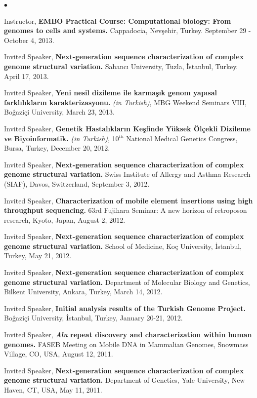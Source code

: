 \documentclass[margin,line]{res}
\newenvironment{list2}{
  \begin{list}{$\bullet$}{%
      \setlength{\itemsep}{0in}
      \setlength{\parsep}{0in} \setlength{\parskip}{0in}
      \setlength{\topsep}{0in} \setlength{\partopsep}{0in} 
      \setlength{\leftmargin}{0.2in}}}{\end{list}}
\begin{document}
\begin{resume}
\begin{list2}
\item 
  Instructor,
  {\bf EMBO Practical Course: Computational biology: From genomes to cells and systems.}
  Cappadocia, Nevşehir, Turkey. September 29 - October 4, 2013.
\item
  Invited Speaker, 
  {\bf  Next-generation sequence characterization of complex genome structural variation.}
  Sabancı University, Tuzla, İstanbul, Turkey. April 17, 2013.
\item
  Invited Speaker, 
  {\bf Yeni nesil dizileme ile karmaşık genom yapısal farklılıkların karakterizasyonu.} {\it (in Turkish)},
  MBG Weekend Seminars VIII, Boğaziçi University, March 23, 2013.  
\item
  Invited Speaker, 
  {\bf Genetik Hastalıkların Keşfinde Yüksek Ölçekli Dizileme ve Biyoinformatik.} {\it (in Turkish)},
  10$^{th}$ National Medical Genetics Congress, Bursa, Turkey,  December 20, 2012.
\item
  Invited Speaker, 
  {\bf  Next-generation sequence characterization of complex genome structural variation.}
  Swiss Institute of Allergy and Asthma Research (SIAF), Davos, Switzerland, September 3, 2012.
\item
  Invited Speaker, 
  {\bf Characterization of mobile element insertions using high throughput sequencing.}
  63rd Fujihara Seminar: A new horizon of retroposon research, Kyoto, Japan, August 2, 2012.
\item
  Invited Speaker, 
  {\bf  Next-generation sequence characterization of complex genome structural variation.}
  School of Medicine, Ko\c{c} University, \.{I}stanbul, Turkey, May 21, 2012.
\item
  Invited Speaker, 
  {\bf  Next-generation sequence characterization of complex genome structural variation.}
  Department of Molecular Biology and Genetics, Bilkent University, Ankara, Turkey, March 14, 2012.
\item
  Invited Speaker,
  {\bf Initial analysis results of the Turkish Genome Project.} 
Bo\u{g}azi\c{c}i University, \.{I}stanbul, Turkey, January 20-21, 2012.

\item
  Invited Speaker, 
  {\bf {\it Alu} repeat discovery and characterization within human genomes.}
  FASEB Meeting on Mobile DNA in Mammalian Genomes, Snowmass Village, CO, USA, August 12, 2011.

\item
  Invited Speaker, 
  {\bf  Next-generation sequence characterization of complex genome structural variation.}
  Department of Genetics, Yale University, New Haven, CT, USA, May 11, 2011.


\end{list2}
\end{resume}
\end{document}
